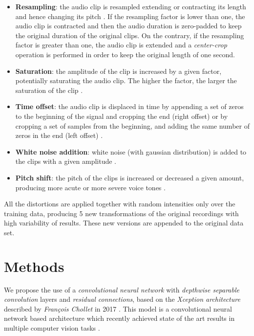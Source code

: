 \documentclass[review]{elsarticle}
\begin{document}
\begin{itemize}
	\item \textbf{Resampling}: the audio clip is resampled extending or contracting its length and hence changing its pitch \cite{Proakis2007}. If the resampling factor is lower than one, the audio clip is contracted and then the audio duration is zero-padded to keep the original duration of the original clips. On the contrary, if the resampling factor is greater than one, the audio clip is extended and a \textit{center-crop} operation is performed in order to keep the original length of one second.
	\item \textbf{Saturation}: the amplitude of the clip is increased by a given factor, potentially saturating the audio clip. The higher the factor, the larger the saturation of the clip \cite{Proakis2007}.
	\item \textbf{Time offset}: the audio clip is displaced in time by appending a set of zeros to the beginning of the signal and cropping the end (right offset) or by cropping a set of samples from the beginning, and adding the same number of zeros in the end (left offset) \cite{Proakis2007}. 
	\item \textbf{White noise addition}: white noise (with gaussian distribution) is added to the clips with a given amplitude \cite{Proakis2007}.
	\item \textbf{Pitch shift}: the pitch of the clips is increased or decreased a given amount, producing more acute or more severe voice tones \cite{Proakis2007, Szymon2016}.
\end{itemize}

All the distortions are applied together with random intensities only over the training data, producing 5 new transformations of the original recordings with high variability of results. These new versions are appended to the original data set.


\section{Methods} \label{sec:methods}
We propose the use of a \textit{convolutional neural network} with \textit{depthwise separable convolution} layers and \textit{residual connections}, based on the \textit{Xception architecture}  described by \textit{François Chollet} in 2017 \cite{FChollet2017}. This model is a convolutional neural network based architecture which recently achieved state of the art results in multiple computer vision tasks \cite{Liu2019, Nazar2018, Song2018, Arriaga2017}. 
\end{document}
